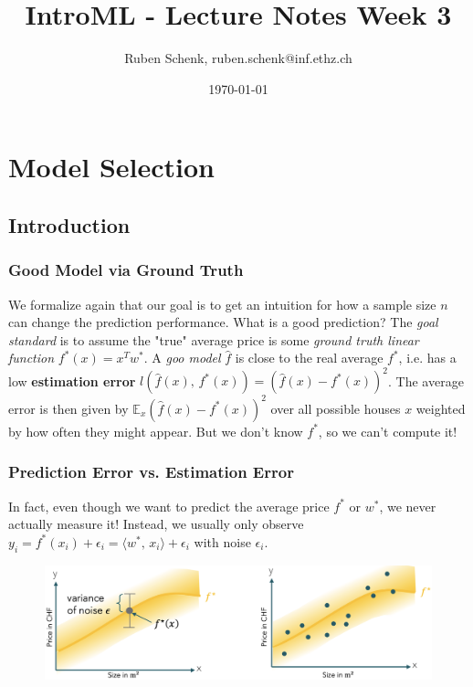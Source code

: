 \documentclass[a4paper]{extarticle}
\title{IntroML - Lecture Notes Week 3}
\author{Ruben Schenk, ruben.schenk@inf.ethz.ch}
\date{\today}
\begin{document}
\maketitle
\newpage

\section{Model Selection}

\subsection{Introduction}

\subsubsection{Good Model via Ground Truth}

We formalize again that our goal is to get an intuition for how a sample size \(n\) can change the prediction performance. What is a good prediction? The \textit{goal standard} is to assume the "true" average price is some \textit{ground truth linear function} \(f^*(x) = x^Tw^*\). A \textit{goo model} \(\hat{f}\) is close to the real average \(f^*\), i.e. has a low \textbf{estimation error} \(l(\hat{f}(x), \, f^*(x)) = (\hat{f}(x) - f^*(x))^2\). The average error is then given by \(\mathbb{E}_x(\hat{f}(x)-f^*(x))^2\) over all possible houses \(x\) weighted by how often they might appear. But we don't know \(f^*\), so we can't compute it!

\subsubsection{Prediction Error vs. Estimation Error}

In fact, even though we want to predict the average price \(f^*\) or \(w^*\), we never actually measure it! Instead, we usually only observe \(y_i = f^*(x_i) + \epsilon_i = \langle w^*, \, x_i \rangle + \epsilon_i\) with noise \(\epsilon_i\).

\begin{figure}[H]
    \includegraphics[width=15cm]{../images/IntroML_Fig3-1}
    \centering
\end{figure}
\end{document}
